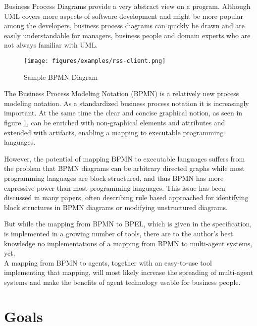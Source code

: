 Business Process Diagrams provide a very abstract view on a program. Although UML covers more aspects of software development and might be more popular among the developers, business process diagrams can quickly be drawn and are easily understandable for managers, business people and domain experts who are not always familiar with UML.

\begin{figure}[htp]
	\centering
	\texttt{[image: figures/examples/rss-client.png]}
	\caption{Sample BPMN Diagram}
	\label{fig:bpmn_intro}
\end{figure}

The Business Process Modeling Notation (BPMN) is a relatively new process modeling notation. As a standardized business process notation it is increasingly important. At the same time the clear and concise graphical notion, as seen in figure \ref{fig:bpmn_intro}, can be enriched with non-graphical elements and attributes and extended with artifacts, enabling a mapping to executable programming languages.

However, the potential of mapping BPMN to executable languages suffers from the problem that BPMN diagrams can be arbitrary directed graphs while most programming languages are block structured, and thus BPMN has more expressive power than most programming languages. This issue has been discussed in many papers, often describing rule based approached for identifying block structures in BPMN diagrams or modifying unstructured diagrams.

But while the mapping from BPMN to BPEL, which is given in the specification, is implemented in a growing number of tools, there are to the author's best knowledge no implementations of a mapping from BPMN to multi-agent systems, yet.
\\

A mapping from BPMN to agents, together with an easy-to-use tool implementing that mapping, will most likely increase the spreading of multi-agent systems and make the benefits of agent technology usable for business people.



\section{Goals}


